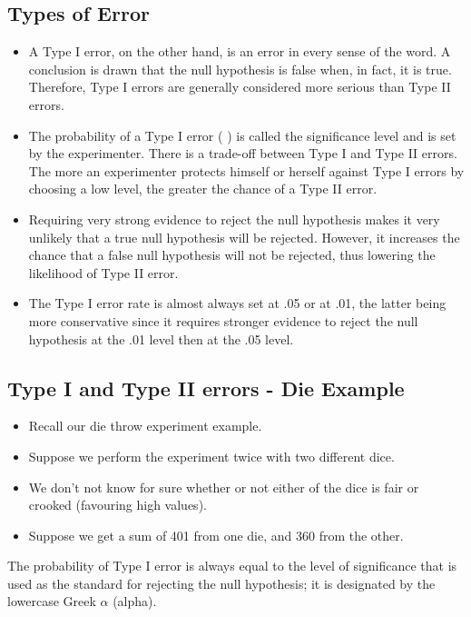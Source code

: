 \subsection{Types of Error}
\begin{itemize}
\item
A Type I error, on the other hand, is an error in every sense of the word. A conclusion is drawn that the null hypothesis is false when, in fact, it is true. Therefore, Type I errors are generally considered more serious than Type II errors.
\item
The probability of a Type I error ( ) is called the significance level and is set by the experimenter. There is a trade-off between Type I and Type II errors. The more an experimenter protects himself or herself against Type I errors by choosing a low level, the greater the chance of a Type II error.
\item
Requiring very strong evidence to reject the null hypothesis makes it very unlikely that a true null hypothesis will be rejected. However, it increases the chance that a false null hypothesis will not be rejected, thus lowering the likelihood of Type II error.
\item
The Type I error rate is almost always set at .05 or at .01, the latter being more conservative since it requires stronger evidence to reject the null hypothesis at the .01 level then at the .05 level.
\end{itemize}


\subsection{Type I and Type II errors - Die Example}
\begin{itemize}
\item Recall our die throw experiment example.
\item Suppose we perform the experiment twice with two different dice.
\item We don't not know for sure whether or not either of the dice is fair or crooked (favouring high values).
\item Suppose we get a sum of 401 from one die, and 360 from the other.
\end{itemize}




The probability of Type I error is always equal to the level of significance that is used as the standard for rejecting
the null hypothesis; it is designated by the lowercase Greek $\alpha$ (alpha).



